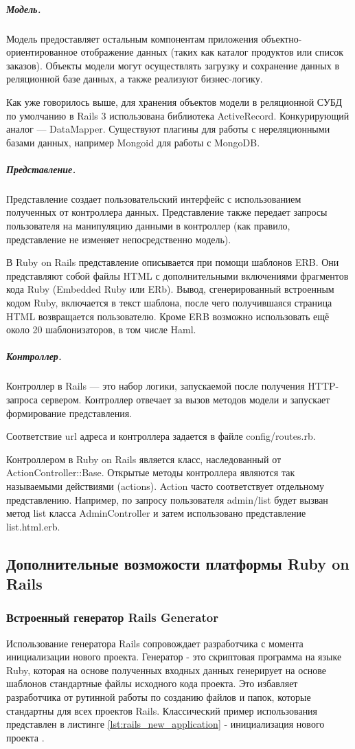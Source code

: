 \subparagraph{Модель.} 
Модель предоставляет остальным компонентам приложения объектно-ориентированное
отображение данных (таких как каталог продуктов или список заказов). Объекты
модели могут осуществлять загрузку и сохранение данных в реляционной базе
данных, а также реализуют бизнес-логику.

Как уже говорилось выше, для хранения объектов модели в реляционной СУБД по
умолчанию в Rails 3 использована библиотека ActiveRecord. Конкурирующий аналог —
DataMapper. Существуют плагины для работы с нереляционными базами данных,
например Mongoid для работы с MongoDB.

\subparagraph{Представление.}
Представление создает пользовательский интерфейс с использованием полученных от
контроллера данных. Представление также передает запросы пользователя на
манипуляцию данными в контроллер (как правило, представление не изменяет
непосредственно модель).

В Ruby on Rails представление описывается при помощи шаблонов ERB. Они
представляют собой файлы HTML с дополнительными включениями фрагментов кода Ruby
(Embedded Ruby или ERb). Вывод, сгенерированный встроенным кодом Ruby,
включается в текст шаблона, после чего получившаяся страница HTML возвращается
пользователю. Кроме ERB возможно использовать ещё около 20 шаблонизаторов, в том
числе Haml.

\subparagraph{Контроллер.}
Контроллер в Rails — это набор логики, запускаемой после получения HTTP-запроса
сервером. Контроллер отвечает за вызов методов модели и запускает формирование
представления.

Соответствие url адреса и контроллера задается в файле config/routes.rb.

Контроллером в Ruby on Rails является класс, наследованный от \\
ActionController::Base. Открытые методы контроллера являются так называемыми
действиями (actions). Action часто соответствует отдельному представлению.
Например, по запросу пользователя admin/list будет вызван метод list класса
AdminController и затем использовано представление \\ list.html.erb.

\subsection{Дополнительные возможости платформы Ruby on Rails}
\subsubsection{Встроенный генератор Rails Generator}
Использование генератора Rails сопровождает разработчика с момента инициализации
нового проекта. Генератор - это скриптовая программа на языке Ruby, которая на
основе полученных входных данных генерирует на основе шаблонов стандартные файлы
исходного кода проекта. Это избавляет разработчика от рутинной работы по
созданию файлов и папок, которые стандартны для всех проектов Rails.
Классический пример использования представлен в листинге
\ref{lst:rails_new_application}  - инициализация нового проекта .

